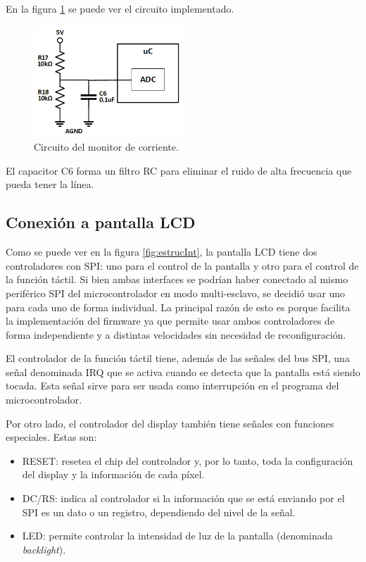 En la figura \ref{fig:monTension} se puede ver el circuito implementado.

\begin{figure}[H]
\centering
\includegraphics[width=0.5\textwidth]{./Figures/mon_tension.png}
\caption{Circuito del monitor de corriente.}
\label{fig:monTension}
\end{figure}

El capacitor C6 forma un filtro RC \citep{WEBSITE:RC_CIRCUIT} para eliminar el ruido de alta frecuencia que pueda tener la línea.

\subsection{Conexión a pantalla LCD}
\label{sec:conLCD}

Como se puede ver en la figura \ref{fig:estrucInt}, la pantalla LCD tiene dos controladores con SPI: uno para el control de la pantalla y otro para el control de la función táctil. Si bien ambas interfaces se podrían haber conectado al mismo periférico SPI del microcontrolador en modo multi-esclavo, se decidió usar uno para cada uno de forma individual. La principal razón de esto es porque facilita la implementación del firmware ya que permite usar ambos controladores de forma independiente y a distintas velocidades sin necesidad de reconfiguración.

El controlador de la función táctil tiene, además de las señales del bus SPI, una señal denominada IRQ que se activa cuando se detecta que la pantalla está siendo tocada. Esta señal sirve para ser usada como interrupción en el programa del microcontrolador.

Por otro lado, el controlador del display también tiene señales con funciones especiales. Estas son:

\begin{itemize}
\item RESET: resetea el chip del controlador y, por lo tanto, toda la configuración del display y la información de cada píxel.
\item DC/RS: indica al controlador si la información que se está enviando por el SPI es un dato o un registro, dependiendo del nivel de la señal.
\item LED: permite controlar la intensidad de luz de la pantalla (denominada \textit{backlight}).
\end{itemize}


